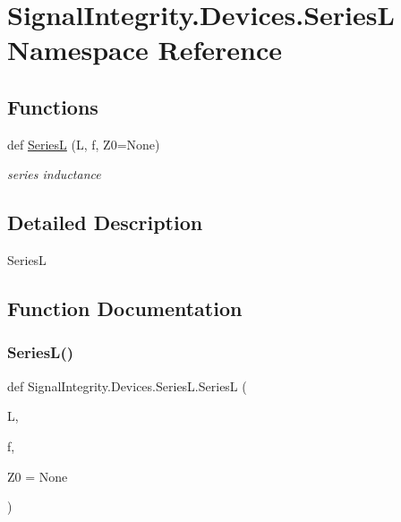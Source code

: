 \hypertarget{namespaceSignalIntegrity_1_1Devices_1_1SeriesL}{}\section{Signal\+Integrity.\+Devices.\+SeriesL Namespace Reference}
\label{namespaceSignalIntegrity_1_1Devices_1_1SeriesL}
\subsection*{Functions}
\begin{DoxyCompactItemize}
\item 
def \hyperlink{namespaceSignalIntegrity_1_1Devices_1_1SeriesL_a5195d4dff01ad4c5c7bda2d3afc879b7}{SeriesL} (L, f, Z0=None)
\begin{DoxyCompactList}\small\item\em series inductance \end{DoxyCompactList}\end{DoxyCompactItemize}


\subsection{Detailed Description}
\begin{DoxyVerb}SeriesL\end{DoxyVerb}
 

\subsection{Function Documentation}
\mbox{\label{namespaceSignalIntegrity_1_1Devices_1_1SeriesL_a5195d4dff01ad4c5c7bda2d3afc879b7}} 
\subsubsection{\texorpdfstring{Series\+L()}{SeriesL()}}
{\footnotesize\ttfamily def Signal\+Integrity.\+Devices.\+Series\+L.\+SeriesL (\begin{DoxyParamCaption}\item[{}]{L,  }\item[{}]{f,  }\item[{}]{Z0 = {\ttfamily None} }\end{DoxyParamCaption})}



